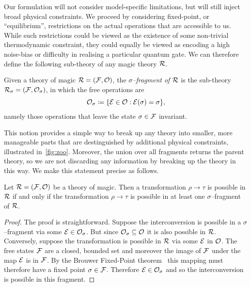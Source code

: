 \documentclass[pra,
aps,
twocolumn,
superscriptaddress,
groupedaddress,
nofootinbib,
reprint
]{revtex4-1}
\begin{document}
Our formulation will not consider model-specific limitations, but will still inject broad physical constraints. We proceed by considering fixed-point, or ``equilibrium'', restrictions on the actual operations that are accessible to us. While such restrictions could be viewed as the existence of some non-trivial thermodynamic constraint, they could equally be viewed as encoding a high noise-bias or difficulty in realising a particular quantum gate. We can therefore define the following sub-theory of any magic theory $\mathcal{R}$.
\begin{definition}\label{def:sigmafrag}
   Given a theory of magic $\mathcal{R} = (\mathcal{F}, \mathcal{O})$, the \emph{$\sigma$--fragment of $\mathcal{R}$} is the sub-theory $\mathcal{R}_\sigma = (\mathcal{F}, \mathcal{O}_\sigma)$, in which the free operations are 
   \begin{equation}
        \mathcal{O}_\sigma \coloneqq \{ \mathcal{E} \in \mathcal{O}: \mathcal{E}(\sigma) = \sigma \},
    \end{equation}
namely those operations that leave the state $\sigma \in \mathcal{F}$ invariant.
\end{definition}
This notion provides a simple way to break up any theory into smaller, more manageable parts that are destinguished by additional physical constraints, illustrated in~\cref{fig:zoo}. Moreover, the union over all fragments returns the parent theory, so we are not discarding any information by breaking up the theory in this way. We make this statement precise as follows.
\begin{theorem}\label{thm:frag}
    Let $\mathcal{R} = (\mathcal{F}, \mathcal{O})$ be a theory of magic.
Then a transformation $\rho \longrightarrow \tau$ is possible in $\mathcal{R}$ if and only if the transformation $\rho \longrightarrow \tau$ is possible in at least one $\sigma$--fragment of $\mathcal{R}$.
\end{theorem}
\begin{proof}
	The proof is straightforward.
   Suppose the interconversion is possible in a $\sigma$--fragment via some $\mathcal{E} \in \mathcal{O}_\sigma$. But since $\mathcal{O}_\sigma \subseteq \mathcal{O}$ it is also possible in $\mathcal{R}$. Conversely, suppose the transformation is possible in $\mathcal{R}$ via some $\mathcal{E}$ in $\mathcal{O}$. The free states $\mathcal{F}$ are a closed, bounded set and moreover the image of $\mathcal{F}$ under the map $\mathcal{E}$ is in $\mathcal{F}$. By the Brouwer Fixed-Point theorem~\cite{cit:brouwer} this mapping must therefore have a fixed point $\sigma \in \mathcal{F}$. Therefore $\mathcal{E} \in \mathcal{O}_\sigma$ and so the interconversion is possible in this fragment.
\end{proof}
\end{document}
